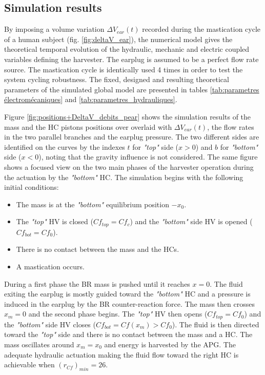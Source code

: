 \documentclass[3p,twocolumn,preprint]{elsarticle}
\begin{document}
	\subsection{Simulation results}	
	\label{subsec:Simulation results}
By imposing a volume variation $\Delta V_{ear}(t)$ recorded during the mastication cycle of a human subject (fig. \ref{fig:deltaV_ear}), the numerical model gives the theoretical temporal evolution of the hydraulic, mechanic and electric coupled variables defining the harvester. The earplug is assumed to be a perfect flow rate source. The mastication cycle is identically used 4 times in order to test the system cycling robustness. The fixed, designed and resulting theoretical parameters of the simulated global model are presented in tables \ref{tab:parametres électromécaniques} and \ref{tab:parametres_hydrauliques}.

Figure \ref{fig:positions+DeltaV_debits_pear} shows the simulation results of the mass and the HC pistons positions over overlaid with $\Delta V_{ear}(t)$, the flow rates in the two parallel branches and the earplug pressure. The two different sides are identified on the curves by the indexes $t$ for \emph{"top"} side ($x>0$) and $b$ for \emph{"bottom"} side ($x<0$), noting that the gravity influence is not considered. The same figure shows a focused view on the two main phases of the harvester operation during the actuation by the \emph{"bottom"} HC. The simulation begins with the following initial conditions:
\begin{itemize}
	\item The mass is at the \emph{"bottom"} equilibrium position $-x_0$.
	\item The \emph{"top"} HV is closed ($Cf_{top} = Cf_c$) and the \emph{"bottom"} side HV is opened ($Cf_{bot} = Cf_0$).
	\item There is no contact between the mass and the HCs.
	\item A mastication occurs.
\end{itemize}

During a first phase the BR mass is pushed until it reaches $x=0$. The fluid exiting the earplug is mostly guided toward the \emph{"bottom"} HC and a pressure is induced in the earplug by the BR counter-reaction force. The mass then crosses $x_m=0$ and the second phase begins. The \emph{"top"} HV then opens ($Cf_{top} = Cf_0$) and the \emph{"bottom"} side HV closes ($Cf_{bot} = Cf(x_m)>Cf_0$). The fluid is then directed toward the \emph{"top"} side and there is no contact between the mass and a HC. The mass oscillates around $x_m=x_0$ and energy is harvested by the APG. The adequate hydraulic actuation making the fluid flow toward the right HC is achievable when \mbox{$(r_{Cf})_{min}=26$}. 
\end{document}
